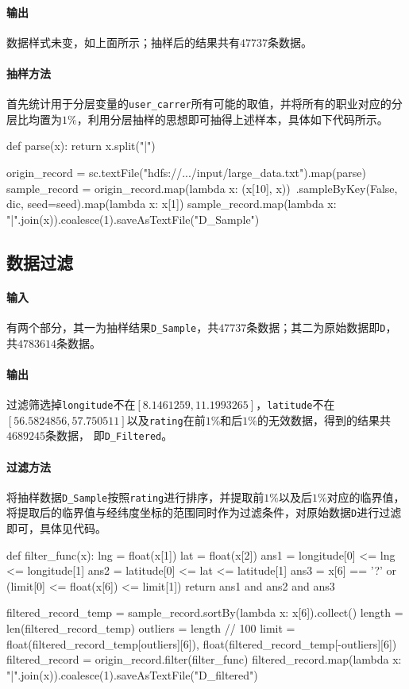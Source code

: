 \documentclass{ML}
\begin{document}
\paragraph{输出}数据样式未变，如上面所示；抽样后的结果共有$47737$条数据。
\paragraph{抽样方法} 首先统计用于分层变量的\texttt{user\_carrer}所有可能的取值，并将所有的职业对应的分层比均置为$1\%$，利用分层抽样的思想即可抽得上述样本，具体如下代码所示。
\begin{pythoncode}
def parse(x):
    return x.split("|")
    
origin_record = sc.textFile("hdfs://.../input/large_data.txt").map(parse)
sample_record = origin_record.map(lambda x: (x[10], x))\
    .sampleByKey(False, dic, seed=seed).map(lambda x: x[1])
sample_record.map(lambda x: "|".join(x)).coalesce(1).saveAsTextFile("D_Sample")
\end{pythoncode}
\subsection{数据过滤}
\paragraph{输入} 有两个部分，其一为抽样结果\texttt{D\_Sample}，共$47737$条数据；其二为原始数据即\texttt{D}，共$4783614$条数据。
\paragraph{输出} 过滤筛选掉\texttt{longitude}不在$[8.1461259, 11.1993265]$，\texttt{latitude}不在$[56.5824856, 57.750511]$以及\texttt{rating}在前$1\%$和后$1\%$的无效数据，得到的结果共$4689245$条数据，
即\texttt{D\_Filtered}。
\paragraph{过滤方法} 将抽样数据\texttt{D\_Sample}按照\texttt{rating}进行排序，并提取前$1\%$以及后$1\%$对应的临界值，将提取后的临界值与经纬度坐标的范围同时作为过滤条件，对原始数据\texttt{D}进行过滤即可，具体见代码。
\begin{pythoncode}
def filter_func(x):
    lng = float(x[1])
    lat = float(x[2])
    ans1 = longitude[0] <= lng <= longitude[1]
    ans2 = latitude[0] <= lat <= latitude[1]
    ans3 = x[6] == '?' or (limit[0] <= float(x[6]) <= limit[1])
    return ans1 and ans2 and ans3

filtered_record_temp = sample_record.sortBy(lambda x: x[6]).collect()
length = len(filtered_record_temp)
outliers = length // 100
limit = float(filtered_record_temp[outliers][6]), 
            float(filtered_record_temp[-outliers][6])
filtered_record = origin_record.filter(filter_func)
filtered_record.map(lambda x: "|".join(x)).coalesce(1).saveAsTextFile("D_filtered")
\end{pythoncode}
\end{document}
